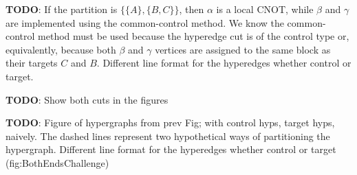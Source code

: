 \textbf{TODO}: If the partition is \(\{\{A\},\{B,C\}\}\), then \(\alpha\) is a local CNOT, while \(\beta\) and \(\gamma\) are implemented using the common-control method. We know the common-control method must be used because the hyperedge cut is of the control type or, equivalently, because both \(\beta\) and \(\gamma\) vertices are assigned to the same block as their targets \(C\) and \(B\). Different line format for the hyperedges whether control or target.

\textbf{TODO}: Show both cuts in the figures

\textbf{TODO}: Figure of hypergraphs from prev Fig; with control hyps, target hyps, naively. The dashed lines represent two hypothetical ways of partitioning the hypergraph. Different line format for the hyperedges whether control or target (fig:BothEndsChallenge)